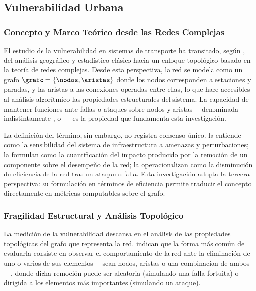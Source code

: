 
\subsection{Vulnerabilidad Urbana}
\label{subsec:vulnerabilidad-urbana}

\subsubsection{Concepto y Marco Teórico desde las Redes Complejas}
\label{subsubsec:vulnerabilidad-redes-complejas}

El estudio de la vulnerabilidad en sistemas de transporte ha transitado, según
\citet{lotero2014vulnerabilidad}, del análisis geográfico y estadístico clásico
hacia un enfoque topológico basado en la teoría de redes complejas. Desde esta
perspectiva, la red se modela como un grafo $\grafo = \{\nodos, \aristas\}$
donde los nodos corresponden a estaciones y paradas, y las aristas a las
conexiones operadas entre ellas, lo que hace accesibles al análisis algorítmico
las propiedades estructurales del sistema. La capacidad de mantener funciones
ante fallas o ataques sobre nodos y aristas ---denominada indistintamente
,  o --- es la
propiedad que fundamenta esta investigación.

La definición del término, sin embargo, no registra consenso único.
\citet{holmgren2006vulnerability} la entiende como la sensibilidad del sistema
de infraestructura a amenazas y perturbaciones; \citet{nagurney2009fragile} la
formulan como la cuantificación del impacto producido por la remoción de un
componente sobre el desempeño de la red; \citet{ouyang2009vulnerability} la
operacionalizan como la disminución de eficiencia de la red tras un ataque o
falla. Esta investigación adopta la tercera perspectiva: su formulación en
términos de eficiencia permite traducir el concepto directamente en métricas
computables sobre el grafo.

\subsubsection{Fragilidad Estructural y Análisis Topológico}
\label{subsubsec:fragilidad-estructural}

La medición de la vulnerabilidad descansa en el análisis de las propiedades
topológicas del grafo que representa la red. \citet{lotero2014vulnerabilidad}
indican que la forma más común de evaluarla consiste en observar el
comportamiento de la red ante la eliminación de uno o varios de sus elementos
---sean nodos, aristas o una combinación de ambos---, donde dicha remoción puede
ser aleatoria (simulando una falla fortuita) o dirigida a los elementos más
importantes (simulando un ataque).

